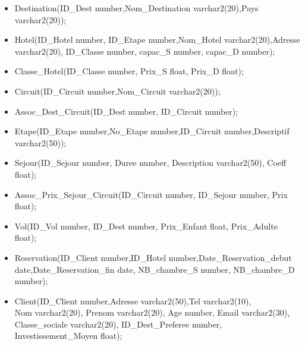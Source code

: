 \begin{itemize}
\item Destination(ID\_Dest number,Nom\_Destination varchar2(20),Pays varchar2(20));\\
\item Hotel(ID\_Hotel number, ID\_Etape number,Nom\_Hotel varchar2(20),Adresse varchar2(20), ID\_Classe number, capac\_S number, capac\_D number);\\
\item Classe\_Hotel(ID\_Classe number, Prix\_S float, Prix\_D float);\\
\item Circuit(ID\_Circuit number,Nom\_Circuit varchar2(20));\\
\item Assoc\_Dest\_Circuit(ID\_Dest number, ID\_Circuit number);\\
\item Etape(ID\_Etape number,No\_Etape number,ID\_Circuit number,Descriptif varchar2(50));\\
\item Sejour(ID\_Sejour number, Duree number, Description varchar2(50), Coeff float);\\
\item Assoc\_Prix\_Sejour\_Circuit(ID\_Circuit number, ID\_Sejour number, Prix float);\\
\item Vol(ID\_Vol number, ID\_Dest number, Prix\_Enfant float, Prix\_Adulte float);\\
\item Reservation(ID\_Client number,ID\_Hotel number,Date\_Reservation\_debut date,Date\_Reservation\_fin date,
NB\_chambre\_S number, NB\_chambre\_D number);\\ 
\item Client(ID\_Client number,Adresse varchar2(50),Tel varchar2(10), \\
		Nom varchar2(20), Prenom varchar2(20), Age number, Email varchar2(30),\\
		Classe\_sociale varchar2(20), ID\_Dest\_Preferee number, Investissement\_Moyen float);\\


\end{itemize}
